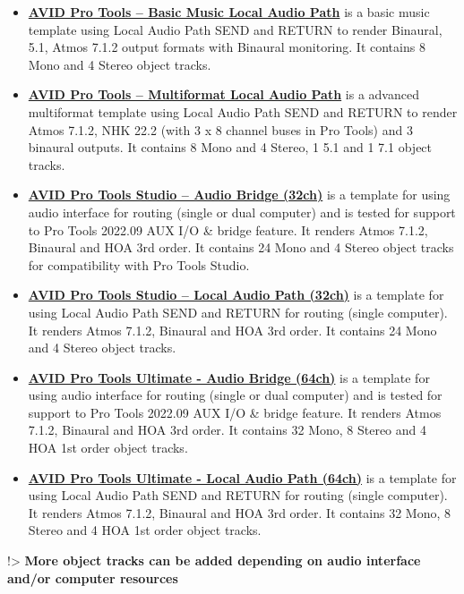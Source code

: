 \documentclass[
  letterpaper,
  DIV=11,
  numbers=noendperiod]{scrreport}
\begin{document}
\begin{itemize}
\item
  \textbf{\href{https://public.3.basecamp.com/p/iCntSJrBatq7CzUua45NHQDt}{AVID
  Pro Tools -- Basic Music Local Audio Path}} is a basic music template
  using Local Audio Path SEND and RETURN to render Binaural, 5.1, Atmos
  7.1.2 output formats with Binaural monitoring. It contains 8 Mono and
  4 Stereo object tracks.
\item
  \textbf{\href{https://public.3.basecamp.com/p/9HweoDCdcAbtdu6cKzxkrmjK}{AVID
  Pro Tools -- Multiformat Local Audio Path}} is a advanced multiformat
  template using Local Audio Path SEND and RETURN to render Atmos 7.1.2,
  NHK 22.2 (with 3 x 8 channel buses in Pro Tools) and 3 binaural
  outputs. It contains 8 Mono and 4 Stereo, 1 5.1 and 1 7.1 object
  tracks.
\item
  \textbf{\href{https://public.3.basecamp.com/p/vECzLo5HWq1pVKk8e7ngK2cg}{AVID
  Pro Tools Studio -- Audio Bridge (32ch)}} is a template for using
  audio interface for routing (single or dual computer) and is tested
  for support to Pro Tools 2022.09 AUX I/O \& bridge feature. It renders
  Atmos 7.1.2, Binaural and HOA 3rd order. It contains 24 Mono and 4
  Stereo object tracks for compatibility with Pro Tools Studio.
\item
  \textbf{\href{https://public.3.basecamp.com/p/rH2nXUmCDdpzXgY46c3LVXuA}{AVID
  Pro Tools Studio -- Local Audio Path (32ch)}} is a template for using
  Local Audio Path SEND and RETURN for routing (single computer). It
  renders Atmos 7.1.2, Binaural and HOA 3rd order. It contains 24 Mono
  and 4 Stereo object tracks.
\item
  \textbf{\href{https://public.3.basecamp.com/p/vECzLo5HWq1pVKk8e7ngK2cg}{AVID
  Pro Tools Ultimate - Audio Bridge (64ch)}} is a template for using
  audio interface for routing (single or dual computer) and is tested
  for support to Pro Tools 2022.09 AUX I/O \& bridge feature. It renders
  Atmos 7.1.2, Binaural and HOA 3rd order. It contains 32 Mono, 8 Stereo
  and 4 HOA 1st order object tracks.
\item
  \textbf{\href{https://public.3.basecamp.com/p/Mindwq33jeEpieRkFetmj6yq}{AVID
  Pro Tools Ultimate - Local Audio Path (64ch)}} is a template for using
  Local Audio Path SEND and RETURN for routing (single computer). It
  renders Atmos 7.1.2, Binaural and HOA 3rd order. It contains 32 Mono,
  8 Stereo and 4 HOA 1st order object tracks.
\end{itemize}

!\textgreater{} \textbf{More object tracks can be added depending on
audio interface and/or computer resources}
\end{document}
